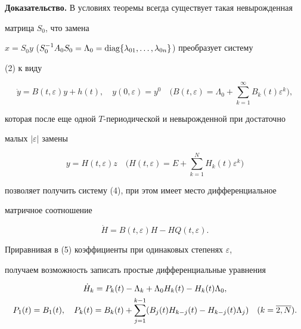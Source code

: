 {\bf Доказательство.} В условиях теоремы всегда существует такая невырожденная 


матрица $S_0$, что замена


$x= S_0 y$ ($S_0^{-1}A_0S_0=\Lambda_0=


\diag \{\lambda_{01},\dotsc,\lambda_{0n} \}$) преобразует систему 


(2) к виду


$$


\Dot{y}= B(t,\varepsilon)y+h(t),\quad y(0,\varepsilon)=y^0


\quad\bigg(B(t,\varepsilon)=\Lambda_0+\sum_{k=1}^\infty


B_k(t)\varepsilon^k\bigg),


$$


которая после еще одной $T$-периодической и невырожденной при достаточно 


малых $|\varepsilon |$ замены


$$


y=H(t,\varepsilon)z \quad\bigg(H(t,\varepsilon)=


E+\sum_{k=1}^N H_k(t)\varepsilon^k\bigg)


$$


позволяет получить систему (4), при этом имеет место дифференциальное 


матричное соотношение


\begin{equation}


\Dot{H}= B(t,\varepsilon)H-HQ(t,\varepsilon).


\end{equation}





Приравнивая в (5) коэффициенты при одинаковых степенях $ \varepsilon $, 


получаем возможность записать простые дифференциальные уравнения


\begin{gather}


\Dot{H}_k=P_k(t)-\Lambda_k+\Lambda_0 H_k(t)-H_k(t)\Lambda_0,\\


%


P_1(t)=B_1(t),\quad P_k(t)=B_k(t)+


\sum_{j=1}^{k-1}(B_j(t)H_{k-j}(t)-H_{k-j}(t)\Lambda_j)


\quad(k=\overline{2,N}).\notag


\end{gather}





